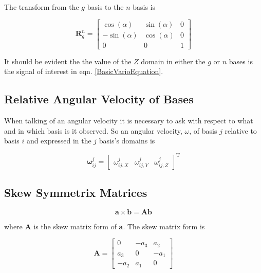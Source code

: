 \documentclass[a4paper]{report}
\numberwithin{equation}{chapter}
\newcommand{\mat}[1]{\boldsymbol{#1}}
\begin{document}
\bigskip

The transform from the $g$ basis to the $n$ basis is

\begin{equation}
\mat{R}^n_g =
\begin{bmatrix}
\cos \left( \alpha \right) & \sin \left( \alpha \right) & 0 \\
-\sin \left( \alpha \right) & \cos \left( \alpha \right) & 0 \\
0 & 0 & 1
\end{bmatrix}
\end{equation}

\bigskip

It should be evident the the value of the $Z$ domain in either the $g$ or $n$ bases is the signal of interest in eqn. \ref{BasicVarioEquation}.

\subsection[Relative Angular Velocity of Bases]{Relative Angular Velocity of Bases}

When talking of an angular velocity it is necessary to ask with respect to what and in which basis is it observed. So an angular velocity, $\omega$, of basis $j$ relative to basis $i$ and expressed in the $j$ basis's domains is

\begin{equation}
\mat{\omega}^j_{ij} =
\begin{bmatrix}
\omega^j_{ij,X} & \omega^j_{ij,Y} & \omega^j_{ij,Z}
\end{bmatrix} ^{\mathrm{T}}
\end{equation}

\subsection[Skew Symmetrix Matrices]{Skew Symmetrix Matrices}

\begin{equation}
\mat{a} \times \mat{b} = \mat{A} \mat{b}
\end{equation}

where $\mat{A}$ is the skew matrix form of $\mat{a}$. The skew matrix form is

\begin{equation}
\mat{A} =
\begin {bmatrix}
0 & -a_3 & a_2 \\
a_3 & 0 & -a_1 \\
-a_2 & a_1 & 0
\end{bmatrix}
\end{equation}
\end{document}
